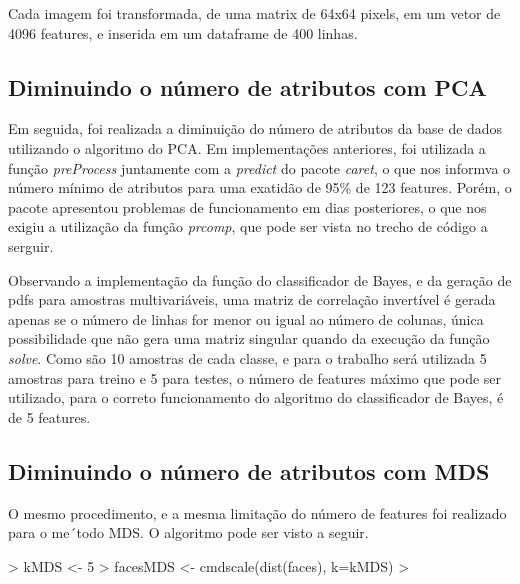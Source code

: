 \documentclass[12pt,a4paper,titlepage]{article}
\begin{document}
Cada imagem foi transformada, de uma matrix de 64x64 pixels, em um vetor de 4096 features, e inserida em um dataframe de 400 linhas.

\subsection{Diminuindo o número de atributos com PCA}

Em seguida, foi realizada a diminuição do número de atributos da base de dados utilizando o algoritmo do PCA. Em implementações anteriores, foi utilizada a função \textit{preProcess} juntamente com a \textit{predict} do pacote \textit{caret}, o que nos informva o número mínimo de atributos para uma exatidão de 95\% de 123 features. Porém, o pacote apresentou problemas de funcionamento em dias posteriores, o que nos exigiu a utilização da função \textit{prcomp}, que pode ser vista no trecho de código a serguir.


\begin{Schunk}
\end{Schunk}

Observando a implementação da função do classificador de Bayes, e da geração de pdfs para amostras multivariáveis, uma matriz de correlação invertível é gerada apenas se o número de linhas for menor ou igual ao número de colunas, única possibilidade que não gera uma matriz singular quando da execução da função \textit{solve}. Como são 10 amostras de cada classe, e para o trabalho será utilizada 5 amostras para treino e 5 para testes, o número de features máximo que pode ser utilizado, para o correto funcionamento do algoritmo do classificador de Bayes, é de 5 features.

\subsection{Diminuindo o número de atributos com MDS}

O mesmo procedimento, e a mesma limitação do número de features foi realizado para o me´todo MDS. O algoritmo pode ser visto a seguir.

\begin{Schunk}
\begin{Sinput}
> kMDS <- 5
> facesMDS <- cmdscale(dist(faces), k=kMDS)
> 
\end{Sinput}
\end{Schunk}
\end{document}

